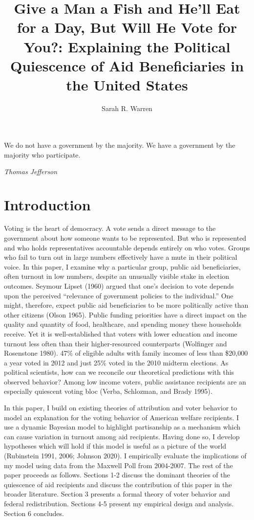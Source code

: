 \documentclass[12pt]{paper}
\title{Give a Man a Fish and He'll Eat for a Day, But Will He Vote for You?: Explaining the Political Quiescence of Aid Beneficiaries in the United States}
\author{Sarah R. Warren}
\date{}
\begin{document}
\maketitle

\setlength{}
\epigraph{We do not have a government by the majority. We have a government by the majority who participate.}{\textit{Thomas Jefferson}}

\section*{Introduction}
Voting is the heart of democracy. A vote sends a direct message to the government about how someone wants to be represented. But who is represented and who holds representatives accountable depends entirely on who votes. Groups who fail to turn out in large numbers effectively have a mute in their political voice. In this paper, I examine why a particular group, public aid beneficiaries, often turnout in low numbers, despite an unusually visible stake in election outcomes. Seymour Lipset (1960) argued that one's decision to vote depends upon the perceived “relevance of government policies to the individual.” One might, therefore, expect public aid beneficiaries to be more politically active than other citizens (Olson 1965). Public funding priorities have a direct impact on the quality and quantity of food, healthcare, and spending money these households receive. Yet it is well-established that voters with lower education and income turnout less often than their higher-resourced counterparts (Wolfinger and Rosenstone 1980). 47\% of eligible adults with family incomes of less than \$20,000 a year voted in 2012 and just 25\% voted in the 2010 midterm elections. As political scientists, how can we reconcile our theoretical predictions with this observed behavior? Among low income voters, public assistance recipients are an especially quiescent voting bloc (Verba, Schlozman, and Brady 1995). 

In this paper, I build on existing theories of attribution and voter behavior to model an explanation for the voting behavior of American welfare recipients. I use a dynamic Bayesian model to highlight partisanship as a mechanism which can cause variation in turnout among aid recipients. Having done so, I develop hypotheses which will hold if this model is useful as a picture of the world (Rubinstein 1991, 2006; Johnson 2020). I empirically evaluate the implications of my model using data from the Maxwell Poll from 2004-2007. The rest of the paper proceeds as follows. Sections 1-2 discuss the dominant theories of the quiescence of aid recipients and discuss the contribution of this paper in the broader literature. Section 3 presents a formal theory of voter behavior and federal redistribution. Sections 4-5 present my empirical design and analysis. Section 6 concludes.
\end{document}
